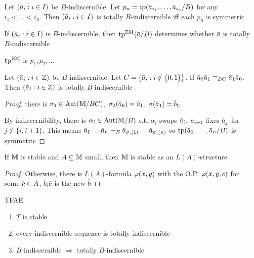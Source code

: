 \documentclass[11pt]{article}
\begin{document}
\begin{remark}
Let \((\bara_i:i\in I)\) be \(B\)-indiscernible. Let \(p_n=\tp(\bara_{i_1},\dots,\bara_{i_n}/B)\) for
any \(i_1<\dots<i_n\). Then \((\bara_i:i\in I)\) is totally \(B\)-indiscernible iff each \(p_n\) is symmetric
\end{remark}

\begin{remark}
If \((\bara_i:i\in I)\) is \(B\)-indiscernible, then \(\tp^{\EM}(\bara/B)\) determines
whether \(\bara\) is totally \(B\)-indiscernible

\(\operatorname{tp}^{\operatorname{EM}}\) is \(p_1,p_2,\dots\)
\end{remark}

\begin{lemma}[]
Let \((\bara_i:i\in\Z)\) be \(B\)-indiscernible. Let \(C=\{\bara_i:i\notin\{0,1\}\}\).
If \(\bara_0\bara_1\equiv_{BC}\bara_1\bara_0\). Then \((\bara_i:i\in\Z)\) is totally \(B\)-indiscernible
\end{lemma}

\begin{proof}
there is \(\sigma_0\in\operatorname{\text{Aut}}(\mathbb{M}/BC)\), \(\sigma_0(\bara_0)=\bara_1\), \(\sigma(\bara_1)=\barb_0\)

By indiscernibility, there is \(\alpha_i\in\operatorname{\text{Aut}}(\mathbb{M}/B)\) s.t. \(\alpha_i\) swaps \(\bara_i\), \(\bara_{i+1}\)
fixes \(\bara_j\) for \(j\notin\{i,i+1\}\). This means \(\bara_1\dots\bara_n\equiv_B\bara_{\sigma_i(1)}\dots\bara_{\sigma_i(n)}\)
so \(\tp(\bara_1,\dots,\bara_n/B)\) is symmetric
\end{proof}

\begin{proposition}[]
If \(\mathbb{M}\) is stable and \(A\subseteq\mathbb{M}\) small, then \(\mathbb{M}\) is stable as an \(L(A)\)-structure
\end{proposition}

\begin{proof}
Otherwise, there is \(L(A)\)-formula \(\varphi(\barx,\bary)\) with the O.P.
\(\varphi(\barx,\bary,\barc)\) for some \(\barc\in A\), \(\barb_i\barc\) is the new \(\barb\)
\end{proof}

\begin{theorem}[]
TFAE
\begin{enumerate}
\item \(T\) is stable
\item every indiscernible sequence is totally indiscernible
\item \(B\)-indiscernible \(\Rightarrow\) totally \(B\)-indiscernible
\end{enumerate}
\end{theorem}
\end{document}
